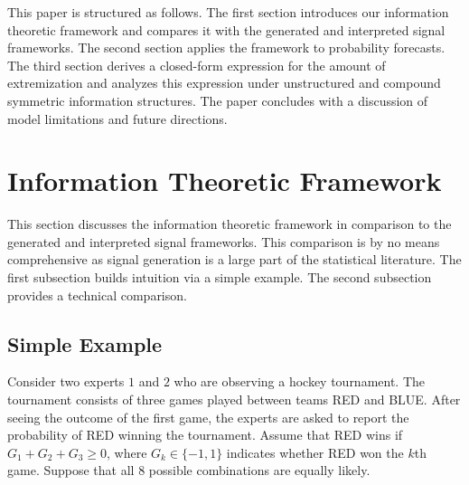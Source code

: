 \documentclass[11pt,twoside]{article}
\begin{document}
This paper is structured as follows. The first section introduces our information theoretic framework and  compares it with the generated and interpreted signal frameworks. The second section applies the framework to probability forecasts. The third section derives a closed-form expression for the amount of extremization and analyzes this expression under unstructured and compound symmetric information structures. The paper concludes with a discussion of  model limitations and future directions. 



\section{Information Theoretic Framework}
This section discusses the information theoretic framework in comparison to the generated and interpreted signal frameworks. This comparison is by no means comprehensive as signal generation is a large part of the statistical literature. The first subsection builds  intuition via a simple example. The second subsection provides a technical comparison. 

\subsection{Simple Example}
Consider two experts $1$ and $2$ who are observing a hockey tournament. The tournament consists of three games played between teams RED and BLUE. After seeing the outcome of the first game, the experts are asked to report the probability of RED winning the tournament. Assume that RED wins if $G_1 + G_2 + G_3 \geq 0$, where $G_k \in \{-1,1\}$ indicates whether RED won the $k$th game. Suppose that all 8 possible combinations are equally likely. 
\end{document}
